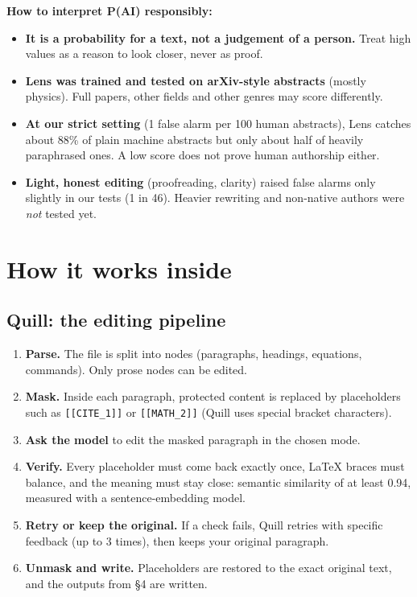 \documentclass[11pt]{article}
\newcommand{\cm}[1]{\texttt{#1}}
\begin{document}
\begin{warn}
\textbf{How to interpret P(AI) responsibly:}
\begin{itemize}
  \item \textbf{It is a probability for a text, not a judgement of a person.} Treat high values as a reason to look closer, never as proof.
  \item \textbf{Lens was trained and tested on arXiv-style abstracts} (mostly physics). Full papers, other fields and other genres may score differently.
  \item \textbf{At our strict setting} (1 false alarm per 100 human abstracts), Lens catches about 88\% of plain machine abstracts but only about half of heavily paraphrased ones. A low score does not prove human authorship either.
  \item \textbf{Light, honest editing} (proofreading, clarity) raised false alarms only slightly in our tests (1 in 46). Heavier rewriting and non-native authors were \emph{not} tested yet.
\end{itemize}
\end{warn}

\section{How it works inside}

\subsection{Quill: the editing pipeline}
\begin{enumerate}
  \item \textbf{Parse.} The file is split into nodes (paragraphs, headings, equations, commands). Only prose nodes can be edited.
  \item \textbf{Mask.} Inside each paragraph, protected content is replaced by placeholders such as \cm{[[CITE\_1]]} or \cm{[[MATH\_2]]} (Quill uses special bracket characters).
  \item \textbf{Ask the model} to edit the masked paragraph in the chosen mode.
  \item \textbf{Verify.} Every placeholder must come back exactly once, LaTeX braces must balance, and the meaning must stay close: semantic similarity of at least 0.94, measured with a sentence-embedding model.
  \item \textbf{Retry or keep the original.} If a check fails, Quill retries with specific feedback (up to 3 times), then keeps your original paragraph.
  \item \textbf{Unmask and write.} Placeholders are restored to the exact original text, and the outputs from \S4 are written.
\end{enumerate}
\end{document}
